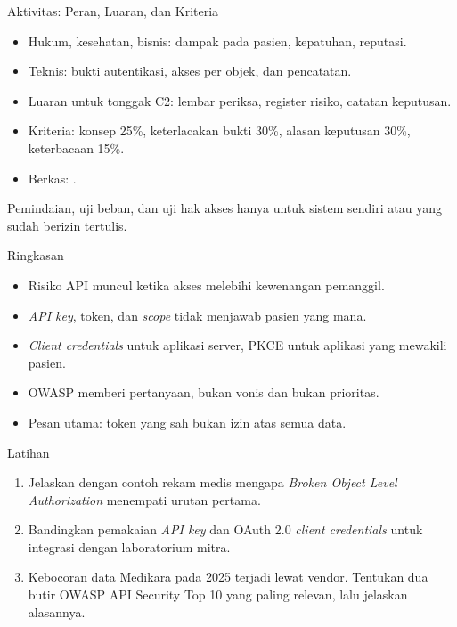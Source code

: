 \documentclass[aspectratio=169, table, 12pt]{beamer}
\begin{document}
\begin{frame}{{\Large Aktivitas: Peran, Luaran, dan Kriteria}}
  \vspace{4pt}
  \begin{itemize}
    \item Hukum, kesehatan, bisnis: dampak pada pasien, kepatuhan, reputasi.
    \item Teknis: bukti autentikasi, akses per objek, dan pencatatan.
    \item Luaran untuk tonggak C2: lembar periksa, register risiko, catatan keputusan.
    \item Kriteria: konsep 25\%, keterlacakan bukti 30\%, alasan keputusan 30\%, keterbacaan 15\%.
    \item Berkas: .
  \end{itemize}
  \vspace{4pt}
  {\small Pemindaian, uji beban, dan uji hak akses hanya untuk sistem sendiri atau yang sudah berizin tertulis.}
\end{frame}

\begin{frame}{{\Large Ringkasan}}
  \vspace{10pt}
  \begin{itemize}
    \item Risiko API muncul ketika akses melebihi kewenangan pemanggil.
    \item \textit{API key}, token, dan \textit{scope} tidak menjawab pasien yang mana.
    \item \textit{Client credentials} untuk aplikasi server, PKCE untuk aplikasi yang mewakili pasien.
    \item OWASP memberi pertanyaan, bukan vonis dan bukan prioritas.
    \item Pesan utama: token yang sah bukan izin atas semua data.
  \end{itemize}
\end{frame}

\begin{frame}{{\Large Latihan}}
  \vspace{10pt}
  \begin{enumerate}
    \item Jelaskan dengan contoh rekam medis mengapa \textit{Broken Object Level Authorization} menempati urutan pertama.
    \item Bandingkan pemakaian \textit{API key} dan OAuth 2.0 \textit{client credentials} untuk integrasi dengan laboratorium mitra.
    \item Kebocoran data Medikara pada 2025 terjadi lewat vendor. Tentukan dua butir OWASP API Security Top 10 yang paling relevan, lalu jelaskan alasannya.
  \end{enumerate}
\end{frame}
\end{document}
